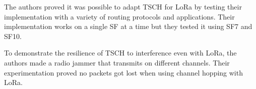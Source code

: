The authors proved it was possible to adapt TSCH for LoRa by testing their
implementation with a variety of routing protocols and applications.
Their implementation works on a single SF at a time but they tested it using
SF7 and SF10.

To demonstrate the resilience of TSCH to interference even with LoRa, the
authors made a radio jammer that transmits on different channels. Their
experimentation proved no packets got lost when using channel hopping with
LoRa.

